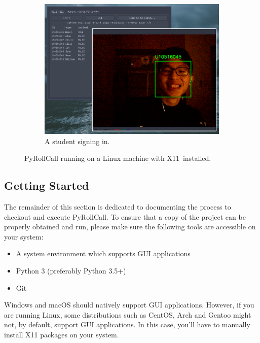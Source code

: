 \begin{figure}[!htb]
\begin{subfigure}[b]{0.32\linewidth}
    \includegraphics[width=\linewidth]{figures/preview3.eps}
    \caption{A student signing in.}
  \end{subfigure}
  \caption{PyRollCall running on a Linux machine with X11\protect\footnotemark \ installed.}
  \label{fig:systemAppearance}
\end{figure}



\subsection{Getting Started}
The remainder of this section is dedicated to documenting the process to checkout and
execute PyRollCall. To ensure that a copy of the project can be properly obtained and
run, please make sure the following tools are accessible on your system:
\vspace{0.5cm}

\begin{itemize}
  \item A system environment which supports GUI applications
  \item Python 3 (preferably Python 3.5+)
  \item Git
 \end{itemize}
\setstretch{\myContentLineSpacing}

Windows and macOS should natively support GUI applications. However, if you are running Linux,
some distributions such as CentOS, Arch and Gentoo might not, by default, support
GUI applications. In this case, you'll have to manually install X11 packages on your system.

